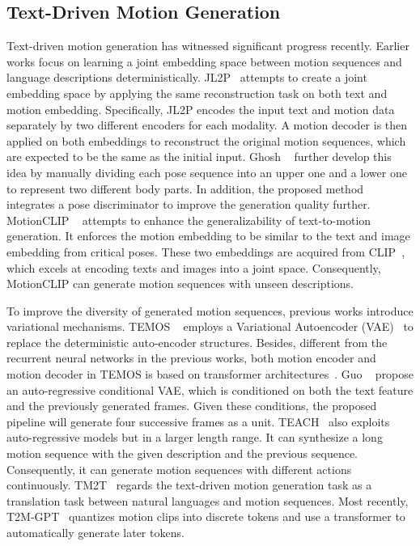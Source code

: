 \documentclass[10pt,twocolumn,letterpaper]{article}
\begin{document}
\subsection{Text-Driven Motion Generation}

Text-driven motion generation has witnessed significant progress recently. Earlier works focus on learning a joint embedding space between motion sequences and language descriptions deterministically. JL2P~\cite{ahuja2019language2pose} attempts to create a joint embedding space by applying the same reconstruction task on both text and motion embedding. Specifically, JL2P encodes the input text and motion data separately by two different encoders for each modality. A motion decoder is then applied on both embeddings to reconstruct the original motion sequences, which are expected to be the same as the initial input. Ghosh \etal~\cite{ghosh2021synthesis} further develop this idea by manually dividing each pose sequence into an upper one and a lower one to represent two different body parts. In addition, the proposed method integrates a pose discriminator to improve the generation quality further. MotionCLIP ~\cite{tevet2022motionclip} attempts to enhance the generalizability of text-to-motion generation. It enforces the motion embedding to be similar to the text and image embedding from critical poses. These two embeddings are acquired from CLIP~\cite{radford2021learning}, which excels at encoding texts and images into a joint space. Consequently, MotionCLIP can generate motion sequences with unseen descriptions.

To improve the diversity of generated motion sequences, previous works introduce variational mechanisms. TEMOS ~\cite{petrovich2022temos} employs a Variational Autoencoder (VAE)~\cite{kingma2013auto} to replace the deterministic auto-encoder structures. Besides, different from the recurrent neural networks in the previous works, both motion encoder and motion decoder in TEMOS is based on transformer architectures~\cite{vaswani2017attention}. Guo \etal ~\cite{guo2022generating} propose an auto-regressive conditional VAE, which is conditioned on both the text feature and the previously generated frames. Given these conditions, the proposed pipeline will generate four successive frames as a unit. TEACH~\cite{athanasiou2022teach} also exploits auto-regressive models but in a larger length range. It can synthesize a long motion sequence with the given description and the previous sequence. Consequently, it can generate motion sequences with different actions continuously. TM2T~\cite{guo2022tm2t} regards the text-driven motion generation task as a translation task between natural languages and motion sequences. Most recently, T2M-GPT~\cite{zhang2023generating} quantizes motion clips into discrete tokens and use a transformer to automatically generate later tokens.
\end{document}
